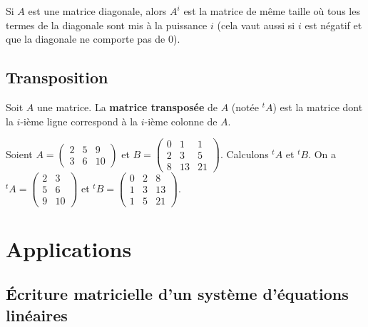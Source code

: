 	\begin{tip}
		Si $A$ est une matrice diagonale, alors $A^i$ est la matrice de même taille où tous les termes de la diagonale sont mis à la puissance $i$ (cela vaut aussi si $i$ est négatif et que la diagonale ne comporte pas de $0$).
	\end{tip}
	
	\subsection{Transposition}
	
	\begin{formula}[Définition]
		Soit $A$ une matrice. La \textbf{matrice transposée} de $A$ (notée $^tA$) est la matrice dont la $i$-ième ligne correspond à la $i$-ième colonne de $A$.
	\end{formula}
	
	\begin{tip}[Exemple]
		Soient $\displaystyle{A = \begin{pmatrix} 2 & 5 & 9 \\ 3 & 6 & 10 \end{pmatrix}}$ et $\displaystyle{B = \begin{pmatrix} 0 & 1 & 1 \\ 2 & 3 & 5 \\ 8 & 13 & 21 \end{pmatrix}}$. Calculons $^tA$ et $^tB$.
		\newpar
		On a $\displaystyle{^tA = \begin{pmatrix} 2 & 3 \\ 5 & 6 \\ 9 & 10 \end{pmatrix}}$ et $\displaystyle{^tB = \begin{pmatrix} 0 & 2 & 8 \\ 1 & 3 & 13 \\ 1 & 5 & 21 \end{pmatrix}}$.
	\end{tip}
	
	\section{Applications}
	
	\subsection{Écriture matricielle d'un système d'équations linéaires}
	
